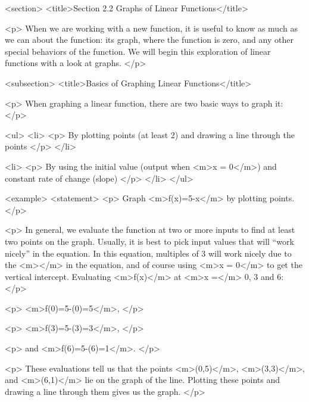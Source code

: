 <section>
    <title>Section 2.2 Graphs of Linear Functions</title>

    <p>
        When we are working with a new function, it is useful to know as much as we can about the function: its graph, where the function is zero, and any other special behaviors of the function.
        We will begin this exploration of linear functions with a look at graphs.
    </p>


    <subsection>
        <title>Basics of Graphing Linear Functions</title>

        <p>
            When graphing a linear function, there are two basic ways to graph it:
        </p>

        <ul>
            <li>
                <p>
                    By plotting points (at least 2) and drawing a line through the points
                </p>
            </li>

            <li>
                <p>
                    By using the initial value (output when <m>x = 0</m>) and constant rate of change (slope)
                </p>
            </li>
        </ul>

        <example>
            <statement>
                <p>
                    Graph <m>f(x)=5-x</m> by plotting points.
                </p>

                <p>
                    In general, we evaluate the function at two or more inputs to find at least two points on the graph.
                    Usually, it is best to pick input values that will “work nicely” in the equation.
                    In this equation, multiples of 3 will work nicely due to the <m></m> in the equation, and of course using <m>x = 0</m> to get the vertical intercept.
                    Evaluating <m>f(x)</m> at <m>x =</m> 0, 3 and 6:
                </p>

                <p>
                    <m>f(0)=5-(0)=5</m>,
                </p>

                <p>
                    <m>f(3)=5-(3)=3</m>,
                </p>

                <p>
                    and <m>f(6)=5-(6)=1</m>.
                </p>

                <p>
                    These evaluations tell us that the points <m>(0,5)</m>, <m>(3,3)</m>, and <m>(6,1)</m> lie on the graph of the line.
                    Plotting these points and drawing a line through them gives us the graph.
                </p>

